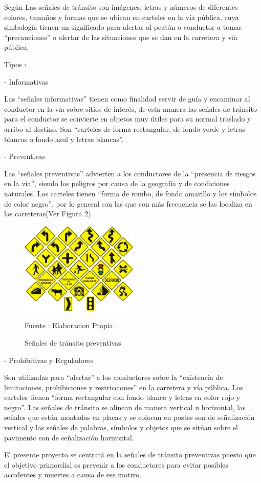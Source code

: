 \documentclass[a4paper, 12pt]{article}
\begin{document}
\begin{enumerate}
Según \cite{caiza2016diseno} Las señales de tránsito son imágenes, letras y números de diferentes colores, tamaños y formas que se ubican en carteles en la vía pública, cuya simbología tienen un significado para  alertar al peatón o conductor a tomar “precauciones” o alertar de las situaciones que se dan en la carretera y vía pública.\par
Tipos :\par
- Informativas \par
Las “señales informativas”  tienen como finalidad servir de guía y encaminar al conductor en la vía sobre sitios de interés, de esta manera las señales de tránsito para el conductor se convierte en objetos muy útiles para su normal traslado y arribo  al destino. Son  “carteles de forma rectangular, de fondo verde y letras blancas o fondo azul y letras blancas”.  \par
- Preventivas \par
Las “señales preventivas” advierten a los conductores de la “presencia de riesgos en la vía”, siendo los peligros por causa de la geografía y de condiciones naturales. Los carteles tienen “forma de  rombo, de fondo amarillo y los símbolos de color negro”, por lo general son las que con más frecuencia se las localiza en las carreteras(Ver Figura 2).\par
\begin{figure}[ht]
\begin{center}
\includegraphics[width=0.5\textwidth]{senales_preventivas}
\end{center}
\begin{center}
\caption{\small{Señales de tránsito preventivas}}
{\small{Fuente : Elaboracion Propia}}
\end{center}
\end{figure}

- Prohibitivas y Reguladores \par 
Son utilizadas para “alertar” a los conductores sobre la “existencia de limitaciones, prohibiciones y restricciones” en la carretera y  vía pública. Los carteles tienen “forma rectangular con fondo blanco y letras en color rojo y negro”. Las señales de tránsito se alinean de manera vertical u horizontal, las señales que están montadas en placas y se colocan en postes son de señalización vertical y las señales de  palabras, símbolos y objetos que se sitúan sobre el pavimento son de señalización horizontal.\par
\vskip 3cm
El presente proyecto se centrará en la señales de tránsito preventivas puesto que el objetivo primordial es prevenir a los conductores para evitar posibles accidentes y muertes a causa de ese motivo.\par
\end{enumerate}
\end{document}

